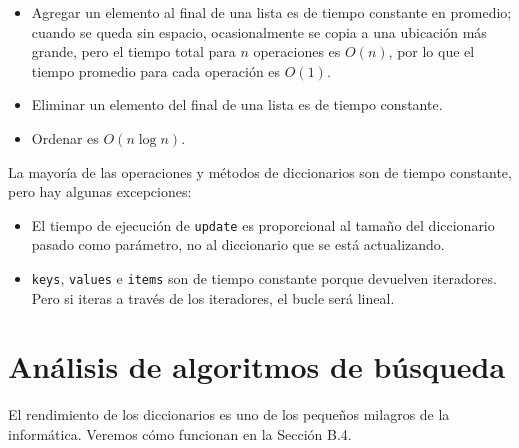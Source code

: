 \begin{itemize}
    \item Agregar un elemento al final de una lista es de tiempo constante en promedio; cuando se queda sin espacio, ocasionalmente se copia a una ubicación más grande, pero el tiempo total para \( n \) operaciones es \( O(n) \), por lo que el tiempo promedio para cada operación es \( O(1) \).
    \item Eliminar un elemento del final de una lista es de tiempo constante.
    \item Ordenar es \( O(n \log n) \).
\end{itemize}

La mayoría de las operaciones y métodos de diccionarios son de tiempo constante, pero hay algunas excepciones:

\begin{itemize}
    \item El tiempo de ejecución de \texttt{update} es proporcional al tamaño del diccionario pasado como parámetro, no al diccionario que se está actualizando.
    \item \texttt{keys}, \texttt{values} e \texttt{items} son de tiempo constante porque devuelven iteradores. Pero si iteras a través de los iteradores, el bucle será lineal.
\end{itemize}

\section{Análisis de algoritmos de búsqueda}

El rendimiento de los diccionarios es uno de los pequeños milagros de la informática. Veremos cómo funcionan en la Sección B.4.

